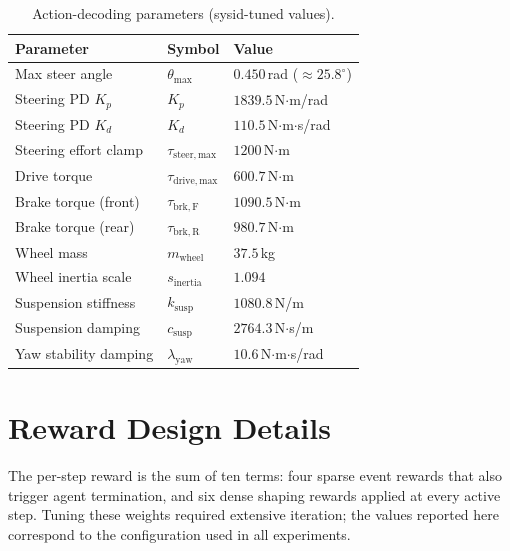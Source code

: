 \begin{table}[h]
  \centering\small
  \caption{Action-decoding parameters (sysid-tuned values).}
  \label{tab:app_action_params}
  \begin{tabular}{@{}lll@{}}
    \toprule
    Parameter & Symbol & Value \\
    \midrule
    Max steer angle        & $\theta_{\max}$               & $0.450$\,rad ($\approx 25.8^{\circ}$) \\
    Steering PD $K_p$      & $K_p$                          & $1839.5$\,N$\cdot$m/rad \\
    Steering PD $K_d$      & $K_d$                          & $110.5$\,N$\cdot$m$\cdot$s/rad \\
    Steering effort clamp  & $\tau_{\mathrm{steer,max}}$   & $1200$\,N$\cdot$m \\
    Drive torque           & $\tau_{\mathrm{drive,max}}$   & $600.7$\,N$\cdot$m \\
    Brake torque (front)   & $\tau_{\mathrm{brk,F}}$      & $1090.5$\,N$\cdot$m \\
    Brake torque (rear)    & $\tau_{\mathrm{brk,R}}$      & $980.7$\,N$\cdot$m \\
    Wheel mass             & $m_{\mathrm{wheel}}$          & $37.5$\,kg \\
    Wheel inertia scale    & $s_{\mathrm{inertia}}$        & $1.094$ \\
    Suspension stiffness   & $k_{\mathrm{susp}}$           & $1080.8$\,N/m \\
    Suspension damping      & $c_{\mathrm{susp}}$           & $2764.3$\,N$\cdot$s/m \\
    Yaw stability damping  & $\lambda_{\mathrm{yaw}}$      & $10.6$\,N$\cdot$m$\cdot$s/rad \\
    \bottomrule
  \end{tabular}
\end{table}


\section{Reward Design Details}
\label{app:rewards}

The per-step reward is the sum of ten terms: four sparse event rewards that also trigger agent termination, and six dense shaping rewards applied at every active step.
Tuning these weights required extensive iteration; the values reported here correspond to the configuration used in all experiments.

